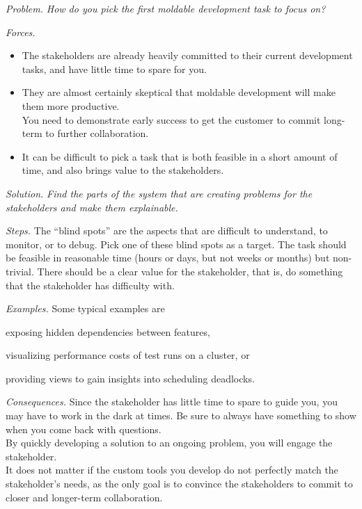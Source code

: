 \documentclass[acmsmall,screen,authorversion,nonacm]{acmart} %
\newcommand\eog[1]{\nbc{Edward}{#1}{purple}}
\newcommand\cp[1]{\nbe{Cesare}{#1}{olive}} %
\newcommand{\patsec}[1]{\noindent\textit{#1.}\xspace}
\begin{document}
\patsec{Problem}
\emph{How do you pick the first moldable development task to focus on?}

\patsec{Forces}
\begin{itemize}[---]
\item The stakeholders are already heavily committed to their current development tasks, and have little time to spare for you.
\item They are almost certainly skeptical that moldable development will make them more productive.\\
You need to demonstrate early success to get the customer to commit long-term to further collaboration.
\item It can be difficult to pick a task that is both feasible in a short amount of time, and also brings value to the stakeholders.
\end{itemize}

\patsec{Solution}
\emph{Find the parts of the system that are creating problems for the stakeholders and make them explainable.}

\patsec{Steps}
The ``blind spots'' are the aspects that are difficult to understand, to monitor, or to debug.
Pick one of these blind spots as a target.
The task should be feasible in reasonable time
(\ie hours or days, but not weeks or months)
but non-trivial.
There should be a clear value for the stakeholder, that is, do something that the stakeholder has difficulty with.


\patsec{Examples}
Some typical examples are 
\begin{inparaenum}[(i)]
\item exposing hidden dependencies between features, 
\item visualizing performance costs of test runs on a cluster, or
\item providing views to gain insights into scheduling deadlocks.
\end{inparaenum}

\patsec{Consequences}
Since 
the stakeholder has little time to spare to guide you, you may have to work in the dark at times.
Be sure to always have something to show when you come back with questions.\\
By quickly developing a solution to an ongoing problem, you will engage the stakeholder.\\
It does not matter if the custom tools you develop do not perfectly match the stakeholder's needs, as the only goal is to convince the stakeholders to commit to closer and longer-term collaboration.
\end{document}
